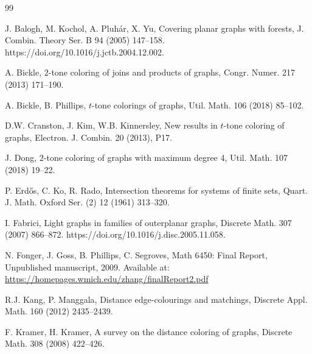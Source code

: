 \documentclass[12pt]{article}
\theoremstyle{plain}
\numberwithin{theorem}{section}
\numberwithin{conjecture}{section}
\numberwithin{corollary}{section}
\numberwithin{example}{section}
\numberwithin{lemma}{section}
\numberwithin{proposition}{section}
\numberwithin{problem}{section}
\numberwithin{remark}{section}
\numberwithin{claim}{theorem}
\numberwithin{definition}{section}
\begin{document}
\begin{thebibliography}{99}

J. Balogh, M. Kochol, A. Pluh\'{a}r, X. Yu,
Covering planar graphs with forests,
J. Combin. Theory Ser. B 94 (2005) 147--158. https://doi.org/10.1016/j.jctb.2004.12.002.

A. Bickle,
$2$-tone coloring of joins and products of graphs,
Congr. Numer. 217 (2013) 171--190.

A. Bickle, B. Phillips,
$t$-tone colorings of graphs,
Util. Math. 106 (2018) 85--102.

D.W. Cranston, J. Kim, W.B. Kinnersley,
New results in $t$-tone coloring of graphs,
Electron. J. Combin. 20 (2013), P17.

J. Dong,
$2$-tone coloring of graphs with maximum degree 4,
Util. Math. 107 (2018) 19--22.

P. Erd\H{o}s, C. Ko, R. Rado,
Intersection theorems for systems of finite sets,
Quart. J. Math. Oxford Ser. (2) 12 (1961) 313--320.

I. Fabrici,
Light graphs in families of outerplanar graphs,
Discrete Math. 307 (2007) 866--872. https://doi.org/10.1016/j.disc.2005.11.058.


N. Fonger, J. Goss, B. Phillips, C. Segroves,
Math 6450: Final Report,
Unpublished manuscript, 2009.
Available at:
\url{https://homepages.wmich.edu/zhang/finalReport2.pdf}

R.J. Kang, P. Manggala,
Distance edge-colourings and matchings,
Discrete Appl. Math. 160 (2012) 2435--2439.

F. Kramer, H. Kramer,
A survey on the distance coloring of graphs,
Discrete Math. 308 (2008) 422--426.
\end{thebibliography}
\end{document}
